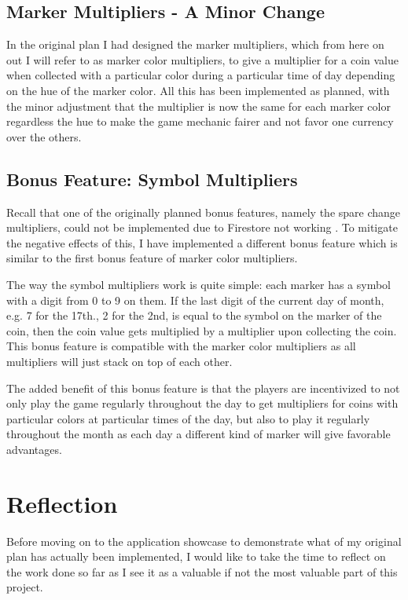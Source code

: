 \documentclass[11pt,a4paper,notitlepage]{article}
\begin{document}
\subsection{Marker Multipliers - A Minor Change}

    In the original plan I had designed the marker multipliers, which from here on out I will refer to as marker color multipliers, to give a multiplier for a coin value when collected with a particular color during a particular time of day depending on the hue of the marker color. All this has been implemented as planned, with the minor adjustment that the multiplier is now the same for each marker color regardless the hue to make the game mechanic fairer and not favor one currency over the others.

\subsection{Bonus Feature: Symbol Multipliers}

    Recall that one of the originally planned bonus features, namely the spare change multipliers, could not be implemented due to Firestore not working \cite{firestore-issue}. To mitigate the negative effects of this, I have implemented a different bonus feature which is similar to the first bonus feature of marker color multipliers.

    The way the symbol multipliers work is quite simple: each marker has a symbol with a digit from 0 to 9 on them. If the last digit of the current day of month, e.g. 7 for the 17th., 2 for the 2nd, is equal to the symbol on the marker of the coin, then the coin value gets multiplied by a multiplier upon collecting the coin. This bonus feature is compatible with the marker color multipliers as all multipliers will just stack on top of each other.

    The added benefit of this bonus feature is that the players are incentivized to not only play the game regularly throughout the day to get multipliers for coins with particular colors at particular times of the day, but also to play it regularly throughout the month as each day a different kind of marker will give favorable advantages.

\section{Reflection}

    Before moving on to the application showcase to demonstrate what of my original plan has actually been implemented, I would like to take the time to reflect on the work done so far as I see it as a valuable if not the most valuable part of this project.
\end{document}
